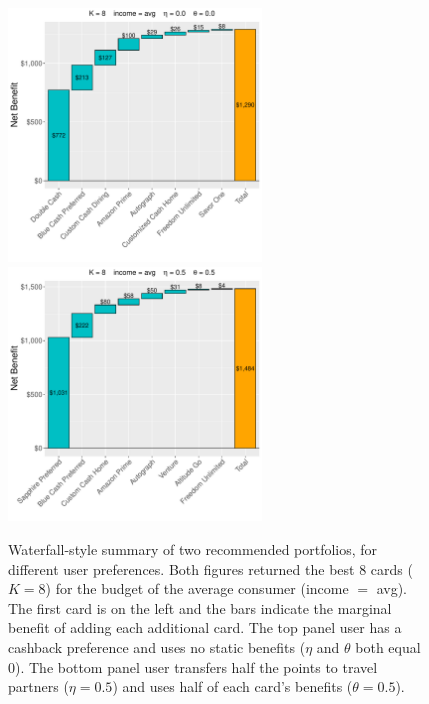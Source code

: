 \begin{figure}[tbh]
    \begin{center}
    \includegraphics[width=0.6\textwidth]{../Figures/Waterfall_avg_8_0_0.pdf}
    \includegraphics[width=0.6\textwidth]{../Figures/Waterfall_avg_8_05_05.pdf}
    \caption{Waterfall-style summary of two recommended portfolios, for different user preferences. Both figures returned the best 8 cards ($K=8$) for the budget of the average consumer (income $=$ avg). The first card is on the left and the bars indicate the marginal benefit of adding each additional card. The top panel user has a cashback preference and uses no static benefits ($\eta$ and $\theta$ both equal 0). The bottom panel user transfers half the points to travel partners ($\eta = 0.5$) and uses half of each card's benefits ($\theta = 0.5$).}
    \label{fig:Waterfall}
    \end{center}
\end{figure}

